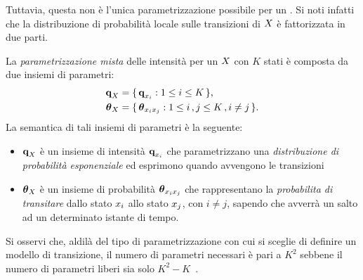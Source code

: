 Tuttavia, questa non è l'unica parametrizzazione possibile per un \mprocess*{} \omog*{}. Si noti infatti che la distribuzione di probabilità locale sulle transizioni di $\mathnormal{X}$ è fattorizzata in due parti.
\begin{definizione}\label{defn:mixed-parametrization}
La \emph{parametrizzazione mista} delle intensità per un \mprocess*{} \omog*{} $\mathnormal{X}$ con $K$ stati è composta da due insiemi di parametri:
\begin{equation}
\begin{split}
\boldsymbol{\textbf{\text{q}}}_{\mathnormal{X}} &= \{\, \boldsymbol{\textbf{\text{q}}}_{\mathnormal{x}_i} : 1 \leq i \leq K \,\} \text{,} \nonumber\\
\boldsymbol{\textbf{\text{$\theta$}}}_{\mathnormal{X}} &= \{\, \boldsymbol{\textbf{\text{$\theta$}}}_{\mathnormal{x}_i\mathnormal{x}_j} : 1 \leq i\,,j \leq K\,,i \neq j \,\} \text{.}
\end{split}
\end{equation}
La semantica di tali insiemi di parametri è la seguente:
\begin{itemize}
    \item $\boldsymbol{\textbf{\text{q}}}_{\mathnormal{X}}$ è un insieme di intensità $\boldsymbol{\textbf{\text{q}}}_{\mathnormal{x}_i}$ che parametrizzano una \emph{distribuzione di probabilità esponenziale} ed esprimono quando avvengono le transizioni
    \item $\boldsymbol{\textbf{\text{$\theta$}}}_{\mathnormal{X}}$ è un insieme di probabilità $\boldsymbol{\textbf{\text{$\theta$}}}_{\mathnormal{x}_i\mathnormal{x}_j}$ che rappresentano la \emph{probabilita di transitare} dallo stato $\mathnormal{x}_i$ allo stato $\mathnormal{x}_j$, con $i \neq j$, sapendo che avverrà un salto ad un determinato istante di tempo.
\end{itemize}
\end{definizione}
\begin{osservazione}
Si osservi che, aldilà del tipo di parametrizzazione con cui si sceglie di definire un modello di transizione, il numero di parametri necessari è pari a $K^2$ sebbene il numero di parametri liberi sia solo $K^2-K$~\citep{Nodelman2007}.
\end{osservazione}
